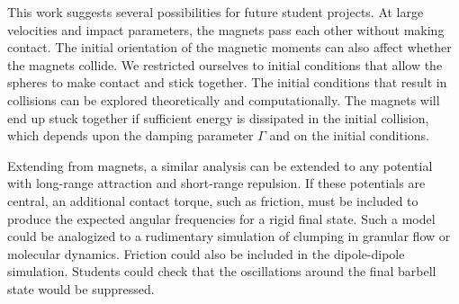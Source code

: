 \documentclass{article}
\begin{document}

This work suggests several possibilities for future student projects. 
At large velocities and impact parameters, the magnets pass each other without making contact.
The initial orientation of the magnetic moments can also affect whether the magnets collide.
We restricted ourselves to initial conditions that allow the spheres to make contact and stick together. 
The initial conditions that result in collisions can be explored theoretically and computationally.
The magnets will end up stuck together if sufficient energy is dissipated in the initial collision, which depends upon the damping parameter $\Gamma$ and on the initial conditions. 

Extending from magnets, a similar analysis can be extended to any potential with long-range attraction and short-range repulsion. 
If these potentials are central, an additional contact torque, such as friction,  \cite{Schwager2008} must be included to produce the expected angular frequencies for a rigid final state. 
Such a model could be analogized to a rudimentary simulation of clumping in granular flow or molecular dynamics.
Friction could also be included in the dipole-dipole simulation. Students could check that the oscillations around the final barbell state would be suppressed. 





\end{document}
